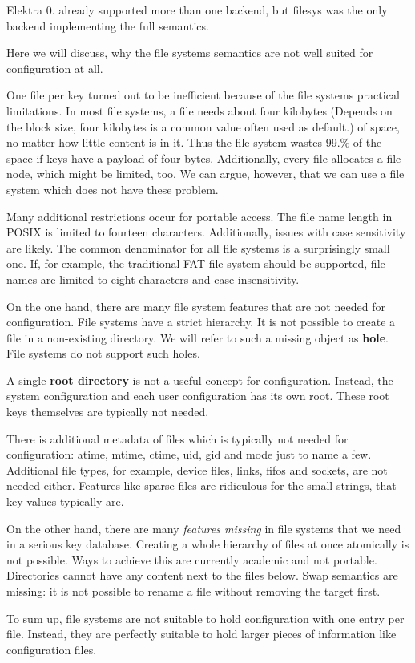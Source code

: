 Elektra 0. already supported more than one backend, but {\ttfamily filesys} was the only backend implementing the full semantics.

Here we will discuss, why the file system\textquotesingle{}s semantics are not well suited for configuration at all.

One file per key turned out to be inefficient because of the file system\textquotesingle{}s practical limitations. In most file systems, a file needs about four kilobytes (Depends on the block size, four kilobytes is a common value often used as default.) of space, no matter how little content is in it. Thus the file system wastes 99.\% of the space if keys have a payload of four bytes. Additionally, every file allocates a file node, which might be limited, too. We can argue, however, that we can use a file system which does not have these problem.

Many additional restrictions occur for portable access. The file name length in P\+O\+S\+IX is limited to fourteen characters. Additionally, issues with case sensitivity are likely. The common denominator for all file systems is a surprisingly small one. If, for example, the traditional F\+AT file system should be supported, file names are limited to eight characters and case insensitivity.

On the one hand, there are many file system features that are not needed for configuration. File systems have a strict hierarchy. It is not possible to create a file in a non-\/existing directory. We will refer to such a missing object as {\bfseries{hole}}. File systems do not support such holes.

A single {\bfseries{root directory}} is not a useful concept for configuration. Instead, the system configuration and each user configuration has its own root. These root keys themselves are typically not needed.

There is additional metadata of files which is typically not needed for configuration\+: atime, mtime, ctime, uid, gid and mode just to name a few. Additional file types, for example, device files, links, fifos and sockets, are not needed either. Features like sparse files are ridiculous for the small strings, that key values typically are.

On the other hand, there are many {\itshape features missing} in file systems that we need in a serious key database. Creating a whole hierarchy of files at once atomically is not possible. Ways to achieve this are currently academic and not portable. Directories cannot have any content next to the files below. Swap semantics are missing\+: it is not possible to rename a file without removing the target first.

To sum up, file systems are not suitable to hold configuration with one entry per file. Instead, they are perfectly suitable to hold larger pieces of information like configuration files. 